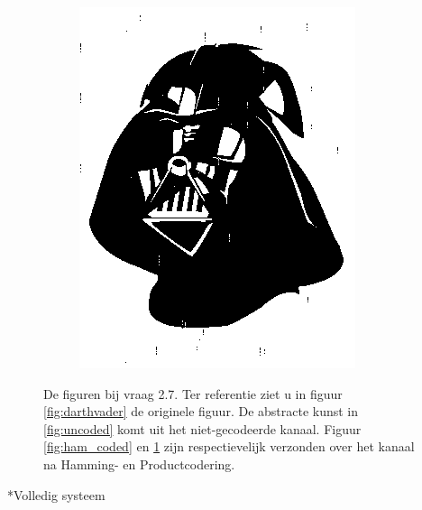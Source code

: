 \documentclass[]{article}
\begin{document}
\begin{section}
\begin{subsection}
\begin{figure}
\begin{subfigure}{0.4\textwidth}
                \includegraphics[width=\textwidth]{prod_coded.png}
                \caption{}
                \label{fig:prod_coded}
            \end{subfigure}

            \caption{De figuren bij vraag 2.7. Ter referentie ziet u in
                figuur \ref{fig:darthvader} de originele figuur. De
                abstracte kunst in \ref{fig:uncoded} komt uit het
                niet-gecodeerde kanaal. Figuur \ref{fig:ham_coded} en
                \ref{fig:prod_coded} zijn respectievelijk verzonden
            over het kanaal na Hamming- en Productcodering.}

            \label{fig:2_7}

        \end{figure}

    \end{subsection}

\end{section}

\begin{section}*{Volledig systeem} %
\end{section}
\end{document}
